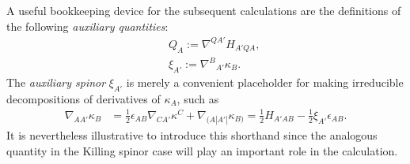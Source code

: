 \documentclass[10pt,a4paper]{article}
\theoremstyle{plain}
\begin{document}
 A useful bookkeeping device for the subsequent
calculations are the definitions of the following \emph{auxiliary quantities}:
\begin{subequations}\label{def_twistor_aux_quants}
  \begin{eqnarray}
      && Q_{A}  := \nabla^{QA'}H_{A'QA}, \label{def_Q_twistor} \\
      && \xi_{A'} := \nabla^B{}_{A'}\kappa_B. \label{def_xi_twistor}
  \end{eqnarray}
\end{subequations}
  The \emph{auxiliary spinor} $\xi_{A'}$ is merely a convenient
  placeholder for making irreducible decompositions of derivatives of
  $\kappa_A$, such as
  \begin{align}\label{decomp_Der_kappa}
    \nabla_{AA'}\kappa _{B} & = \tfrac{1}{2} \epsilon _{AB}
    \nabla_{CA'}\kappa ^{C} + \nabla_{(A|A'|}\kappa _{B)} = \tfrac{1}{2} H_{A'AB} - \tfrac{1}{2} \xi _{A'} \epsilon_{AB}.
  \end{align}
It is nevertheless illustrative to introduce this
  shorthand since the analogous quantity in the Killing spinor case
  will play an important role in the calculation.

  \medskip
  
\end{document}

